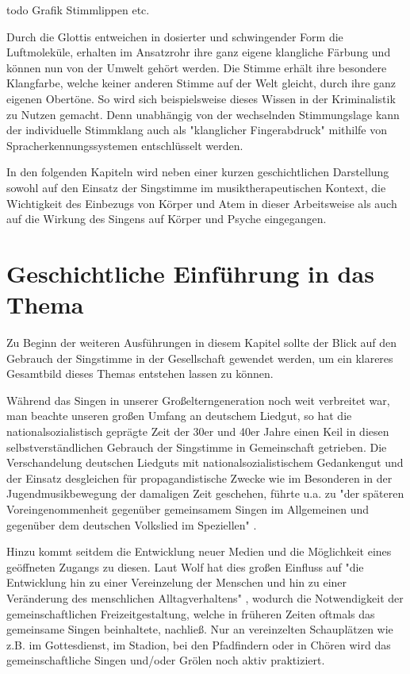 todo Grafik Stimmlippen etc.

Durch die Glottis entweichen in dosierter und schwingender Form die Luftmoleküle, erhalten im Ansatzrohr ihre ganz eigene klangliche Färbung und können nun von der Umwelt gehört werden. Die Stimme erhält ihre besondere Klangfarbe, welche keiner anderen Stimme auf der Welt gleicht, durch ihre ganz eigenen Obertöne. So wird sich beispielsweise dieses Wissen in der Kriminalistik zu Nutzen gemacht. Denn unabhängig von der wechselnden Stimmungslage kann der individuelle Stimmklang auch als "klanglicher Fingerabdruck" \autocite[482]{rittner2009a} mithilfe von Spracherkennungssystemen entschlüsselt werden. 

In den folgenden Kapiteln wird neben einer kurzen geschichtlichen Darstellung sowohl auf den Einsatz der Singstimme im musiktherapeutischen Kontext, die Wichtigkeit des Einbezugs von Körper und Atem in dieser Arbeitsweise als auch auf die Wirkung des Singens auf Körper und Psyche eingegangen.

\section{Geschichtliche Einführung in das Thema}
Zu Beginn der weiteren Ausführungen in diesem Kapitel sollte der Blick auf den Gebrauch der Singstimme in der Gesellschaft gewendet werden, um ein klareres Gesamtbild dieses Themas entstehen lassen zu können.

Während das Singen in unserer Großelterngeneration noch weit verbreitet war, man beachte unseren großen Umfang an deutschem Liedgut, so hat die nationalsozialistisch geprägte Zeit der 30er und 40er Jahre einen Keil in diesen selbstverständlichen Gebrauch der Singstimme in Gemeinschaft getrieben.
Die Verschandelung deutschen Liedguts mit nationalsozialistischem Gedankengut und der Einsatz desgleichen für propagandistische Zwecke wie im Besonderen in der Jugendmusikbewegung der damaligen Zeit geschehen, führte u.a. zu "der späteren Voreingenommenheit gegenüber gemeinsamem Singen im Allgemeinen und gegenüber dem deutschen Volkslied im Speziellen" \autocite[9]{wolf2012}.

Hinzu kommt seitdem die Entwicklung neuer Medien und die Möglichkeit eines geöffneten Zugangs zu diesen. Laut Wolf hat dies großen Einfluss auf "die Entwicklung hin zu einer Vereinzelung der Menschen und hin zu einer Veränderung des menschlichen Alltagverhaltens" \autocite[10]{wolf2012}, wodurch die Notwendigkeit der gemeinschaftlichen Freizeitgestaltung, welche in früheren Zeiten oftmals das gemeinsame Singen beinhaltete, nachließ. Nur an vereinzelten Schauplätzen wie z.B. im Gottesdienst, im Stadion, bei den Pfadfindern oder in Chören wird das gemeinschaftliche Singen und/oder Grölen noch aktiv praktiziert.

